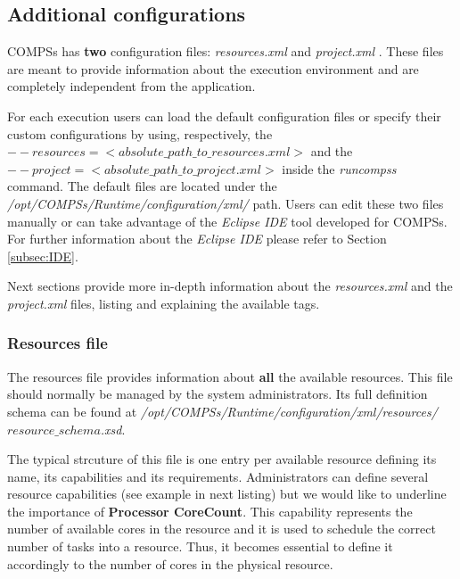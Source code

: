 \subsection{Additional configurations}

COMPSs has \textbf{two} configuration files: \textit{resources.xml} and \textit{project.xml} . 
These files are meant to provide information about the execution environment 
and are completely independent from the application.

For each execution users can load the default configuration files or specify their custom configurations 
by using, respectively, the \textit{$--resources=<absolute\_path\_to\_resources.xml>$} and the
\textit{$--project=<absolute\_path\_to\_project.xml>$} inside the \textit{runcompss} command. The default files are located 
under the \emph{/opt/COMPSs/Runtime/configuration/xml/} path. 
Users can edit these two files manually or can take advantage of the \textit{Eclipse IDE} tool developed for COMPSs. For further 
information about the \textit{Eclipse IDE} please refer to Section \ref{subsec:IDE}. 


Next sections provide more in-depth information about the \textit{resources.xml} and the \textit{project.xml} files, listing and 
explaining the available tags.

\subsubsection{Resources file}
The resources file provides information about \textbf{all} the available resources. This file should normally be 
managed by the system administrators. Its full definition schema can be found at 
\emph{/opt/COMPSs/Runtime/configuration/xml/resources/$resource\_schema$.xsd}.

The typical strcuture of this file is one entry per available resource defining its name, its capabilities and its requirements.
Administrators can define several resource capabilities (see example in next listing) but we would like 
to underline the importance of \textbf{Processor CoreCount}. This capability represents the number of available cores 
in the resource and it is used to schedule the correct number of tasks into a resource. Thus, it becomes essential to define 
it accordingly to the number of cores in the physical resource. 

